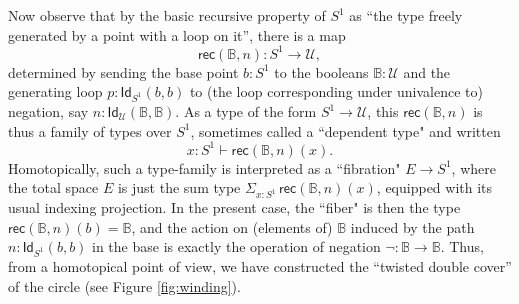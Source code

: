\documentclass[11pt]{article}
\newcommand{\B}{\ensuremath{\mathbb{B}}}
\newcommand{\Id}{\mathsf{Id}}
\newcommand{\id}[1]{\Id_{#1}}
\newcommand{\rec}{\mathsf{rec}}
\newcommand{\U}{\ensuremath{\mathcal{U}}}
\begin{document}
Now observe that by the basic recursive property of $S^1$ as ``the type freely generated by a point with a loop on it'', there is a map $$\rec(\B,n): S^1 \to \U,$$ determined by sending the base point $b:S^1$ to the booleans $\B:\U$ and the generating loop $p : \id{S^1}(b,b)$ to (the loop corresponding under univalence to) negation, say $n : \id{\U}(\B,\B)$.  As a type of the form $S^1\to\U$, this $\rec(\B,n)$ is thus a family of types over $S^1$, sometimes called a ``dependent type" and written $$x:S^1 \vdash \rec(\B,n)(x).$$  Homotopically, such a type-family is interpreted as a ``fibration" $E\to S^1$, where the total space $E$ is just the sum type $\Sigma_{x:S^1}\,\rec(\B,n)(x)$, equipped with its usual indexing projection.  In the present case, the ``fiber" is then the type $\rec(\B,n)(b) = \B$, and the action on (elements of) $\B$ induced by the path $n: \id{S^1}(b,b)$ in the base is exactly the operation of negation $\neg : \B\to \B$.  Thus, from a homotopical point of view, we have constructed the ``twisted double cover'' of the circle (see Figure \ref{fig:winding}).
%
%
%
\end{document}
